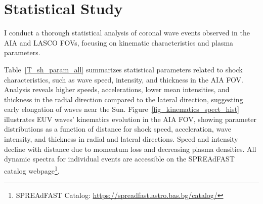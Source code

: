 \section{Statistical Study}
I conduct a thorough statistical analysis of coronal wave events observed in the AIA and LASCO FOVs, focusing on kinematic characteristics and plasma parameters.

Table~\ref{T_sh_param_all} summarizes statistical parameters related to shock characteristics, such as wave speed, intensity, and thickness in the AIA FOV.
Analysis reveals higher speeds, accelerations, lower mean intensities, and thickness in the radial direction compared to the lateral direction, suggesting early elongation of waves near the Sun.
Figure~\ref{fig_kinematics_spect_hist} illustrates EUV waves' kinematics evolution in the AIA FOV, showing parameter distributions as a function of distance for shock speed, acceleration, wave intensity, and thickness in radial and lateral directions.
Speed and intensity decline with distance due to momentum loss and decreasing plasma densities. All dynamic spectra for individual events are accessible on the SPREAdFAST catalog webpage\footnote{SPREAdFAST Catalog: \url{https://spreadfast.astro.bas.bg/catalog/}}.

\begin{table}[!htp] %
	\centering
	\caption{Statistics of the EUV wave kinematics in the SDO/AIA FOV for the 26 events. LL and LR refer to the lateral left and right flanks, respectively. Rad refer to the radial front direction.}
	\label{T_sh_param_all}
\end{table}

